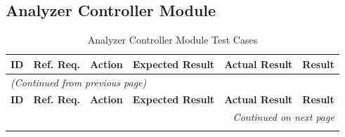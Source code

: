 \documentclass[12pt, titlepage]{article}
\begin{document}
\subsection{Analyzer Controller Module}

\begin{longtable}{c
    >{\raggedright\arraybackslash}p{1.5cm}
    >{\raggedright\arraybackslash}p{4.5cm}
    >{\raggedright\arraybackslash}p{4cm}
  >{\raggedright\arraybackslash}p{3cm} c}
  \toprule
  \textbf{ID} & \textbf{Ref. Req.} & \textbf{Action} &
  \textbf{Expected Result} & \textbf{Actual Result} & \textbf{Result} \\
  \midrule
  \endfirsthead

  \multicolumn{6}{l}{\textit{(Continued from previous page)}} \\
  \toprule
  \textbf{ID} & \textbf{Ref. Req.} & \textbf{Action} &
  \textbf{Expected Result} & \textbf{Actual Result} & \textbf{Result} \\
  \midrule
  \endhead

  \multicolumn{6}{r}{\textit{Continued on next page}} \\
  \endfoot

  \bottomrule
  \caption{Analyzer Controller Module Test Cases}
  \label{table:analyzer_controller_tests}
  \endlastfoot


\end{longtable}
\end{document}

